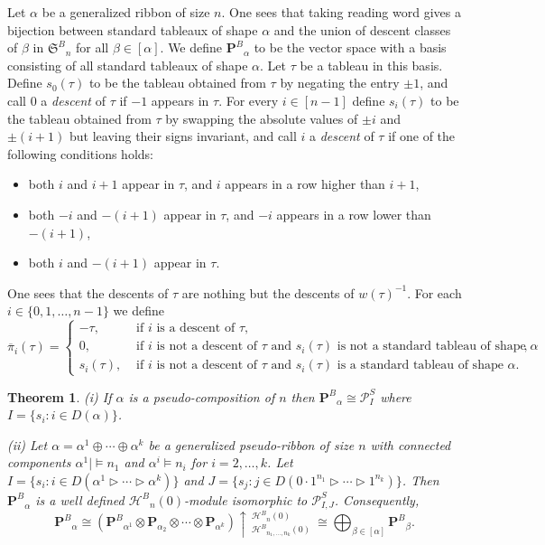 \documentclass{amsart}
\newtheorem{theorem}{Theorem}[section]
\newtheorem*{Young's Rule}{Young's Rule}
\theoremstyle{definition}
\theoremstyle{remark}
\numberwithin{equation}{section}
\begin{document}
Let $\alpha$ be a generalized ribbon of size $n$. One sees that taking reading word gives a bijection between standard tableaux of shape $\alpha$ and the union of descent classes of $\beta$ in ${{\mathfrak S}^B}_n$ for all $\beta \in [\alpha]$. We define ${\mathbf{P}^B}_\alpha$ to be the vector space with a basis consisting of all standard tableaux of shape $\alpha$. Let $\tau$ be a tableau in this basis. Define $s_0(\tau)$ to be the tableau obtained from $\tau$ by negating the entry $\pm1$, and call $0$ a \emph{descent} of $\tau$ if $-1$ appears in $\tau$. For every $i\in[n-1]$ define $s_i(\tau)$ to be the tableau obtained from $\tau$ by swapping the absolute values of $\pm i$ and $\pm(i+1)$ but leaving their signs invariant, and call $i$ a \emph{descent} of $\tau$ if one of the following conditions holds:
\begin{itemize}
\item
both $i$ and $i+1$ appear in $\tau$, and $i$ appears in a row higher than $i+1$,
\item
both $-i$ and $-(i+1)$ appear in $\tau$, and $-i$ appears in a row lower than $-(i+1)$,
\item
both $i$ and $-(i+1)$ appear in $\tau$.
\end{itemize}
One sees that the descents of $\tau$ are nothing but the descents of $w(\tau)^{-1}$. For each $i\in\{0,1,\ldots,n-1\}$ we define
\begin{equation}\label{eq:ActionB}
{\overline{\pi}}_i(\tau)=
\begin{cases}
-\tau, & \textrm{ if $i$ is a descent of $\tau$},\\
0, & \textrm{ if $i$ is not a descent of $\tau$ and $s_i(\tau)$ is not a standard tableau of shape $\alpha$},\\
s_i(\tau), & \textrm{ if $i$ is not a descent of $\tau$ and $s_i(\tau)$ is a standard tableau of shape $\alpha$}.
\end{cases}
\end{equation}

\begin{theorem}\label{thm:IndPB}
(i) If $\alpha$ is a pseudo-composition of $n$ then ${\mathbf{P}^B}_\alpha \cong {\mathcal{P}}_I^S$ where $I=\{s_i:i\in D(\alpha)\}$.

\noindent(ii) Let $\alpha=\alpha^1 \oplus \cdots \oplus \alpha^k$ be a generalized pseudo-ribbon of size $n$ with connected components $\alpha^1\mid\models n_1$ and $\alpha^i\models n_i$ for $i=2,\ldots,k$. Let $I=\{s_i: i\in D(\alpha^1\rhd\cdots\rhd \alpha^k)\}$ and $J=\{s_j:j\in D(0\cdot1^{n_1}\rhd\cdots\rhd 1^{n_k}) \}$. Then ${\mathbf{P}^B}_\alpha$ is a well defined ${\mathcal{H}^B}_n(0)$-module isomorphic to ${\mathcal{P}_{I,J}^S}$. Consequently,
\[ {\mathbf{P}^B}_\alpha \cong \left({\mathbf{P}^B}_{\alpha^1}\otimes{\mathbf{P}}_{\alpha_2}\otimes\cdots\otimes {\mathbf{P}}_{\alpha^k}\right)
\uparrow\,_{{\mathcal{H}^B}_{n_1,\ldots,n_k}(0)}^{{\mathcal{H}^B}_n(0)}\ \cong
\bigoplus_{\beta\in[\alpha]}{\mathbf{P}^B}_\beta. \]
\end{theorem}
\end{document}
